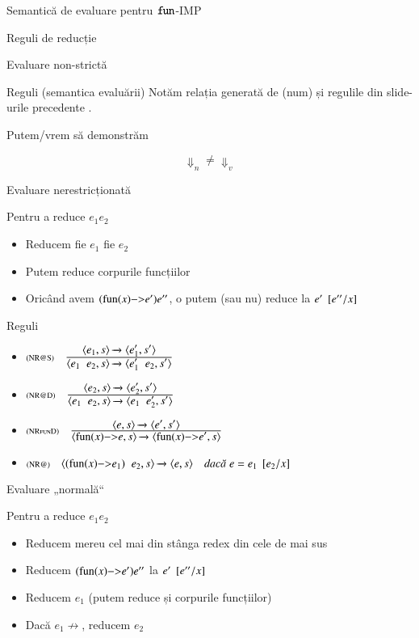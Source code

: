 \documentclass[xcolor=pdftex,romanian,colorlinks]{beamer}
\begin{document}
\begin{section}{Semantică de evaluare pentru $\mathrel{\text{\ttfamily fun}}$-IMP}
\begin{subsection}{Reguli de reducție}
\begin{frame}{Evaluare non-strictă}
\begin{overprint}
\begin{block}{Reguli (semantica evaluării)}
Notăm relația generată de ({\sc num}) și regulile din slide-urile precedente . 
\end{block}
\end{overprint}
\end{frame}

\begin{frame}{Putem/vrem să demonstrăm}

\[ \Downarrow_n \neq \Downarrow_v \]
\end{frame}

\begin{frame}{Evaluare nerestricționată}
\begin{block}{}
Pentru a reduce $e_1 \mathrel{} e_2$
\begin{itemize}
\item Reducem fie $e_1$ fie $e_2$
\item Putem reduce corpurile funcțiilor
\item Oricând avem  $(\fun{x}{e'}) e''$, o putem (sau nu)
reduce la $e'\mathbin{}[e''/x]$
\end{itemize} 
\end{block}

\begin{block}{Reguli}
\begin{itemize}
\item[]$\reg[NR@S]{\Ss{\c{e_1\mathrel{}e_2,s}}{\c{e_1'\mathrel{}e_2,s'}}}{\Ss{\c{e_1,s}}{\c{e_1',s'}}}{}$
\item[]$\reg[NR@D]{\Ss{\c{e_1\mathrel{}e_2,s}}{\c{e_1\mathrel{}e_2',s'}}}{\Ss{\c{e_2,s}}{\c{e_2',s'}}}{}$
\item[]$\reg[NRfunD]{\Ss{\c{\fun{x}{e},s}}{\c{\fun{x}{e'},s}}}{\Ss{\c{e,s}}{\c{e',s'}}}{}$
\item[]$\reg[NR@]{\Ss{\c{(\fun{x}{e_1})\mathrel{}e_2,s}}{\c{e,s}}}{}{e = \substapp{e_1}{\subst{\substpair{e_2}{x}}}}$
\end{itemize}
\end{block}
\end{frame}

\begin{frame}{Evaluare „normală“}
\begin{block}{}
Pentru a reduce $e_1 \mathrel{} e_2$
\begin{itemize}
\item Reducem mereu cel mai din stânga redex din cele de mai sus
\item Reducem $(\fun{x}{e'}) e''$ la $e'\mathbin{}[e''/x]$
\item Reducem $e_1$ (putem reduce și corpurile funcțiilor)
\item Dacă $e_1\not\rightarrow$, reducem $e_2$
\end{itemize} 
\end{block}


\end{frame}
\end{subsection}
\end{section}
\end{document}
